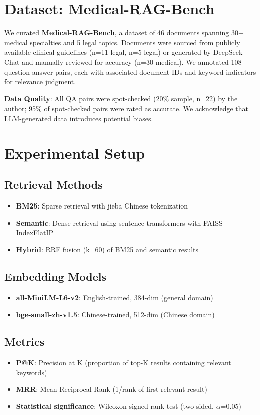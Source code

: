 ﻿\documentclass[11pt,a4paper]{article}
\begin{document}
\section{Dataset: Medical-RAG-Bench}

We curated \textbf{Medical-RAG-Bench}, a dataset of 46 documents spanning 30+ medical specialties and 5 legal topics. Documents were sourced from publicly available clinical guidelines (n=11 legal, n=5 legal) or generated by DeepSeek-Chat and manually reviewed for accuracy (n=30 medical). We annotated 108 question-answer pairs, each with associated document IDs and keyword indicators for relevance judgment.

\textbf{Data Quality}: All QA pairs were spot-checked (20\% sample, n=22) by the author; 95\% of spot-checked pairs were rated as accurate. We acknowledge that LLM-generated data introduces potential biases.

\section{Experimental Setup}

\subsection{Retrieval Methods}
\begin{itemize}[nosep]
    \item \textbf{BM25}: Sparse retrieval with jieba Chinese tokenization~\cite{robertson2009bm25}
    \item \textbf{Semantic}: Dense retrieval using sentence-transformers with FAISS Index\-Flat\-IP
    \item \textbf{Hybrid}: RRF fusion (k=60) of BM25 and semantic results
\end{itemize}

\subsection{Embedding Models}
\begin{itemize}[nosep]
    \item \textbf{all-MiniLM-L6-v2}: English-trained, 384-dim (general domain)
    \item \textbf{bge-small-zh-v1.5}: Chinese-trained, 512-dim (Chinese domain)
\end{itemize}

\subsection{Metrics}
\begin{itemize}[nosep]
    \item \textbf{P@K}: Precision at K (proportion of top-K results containing relevant keywords)
    \item \textbf{MRR}: Mean Reciprocal Rank (1/rank of first relevant result)
    \item \textbf{Statistical significance}: Wilcoxon signed-rank test (two-sided, $\alpha$=0.05)
\end{itemize}
\end{document}
